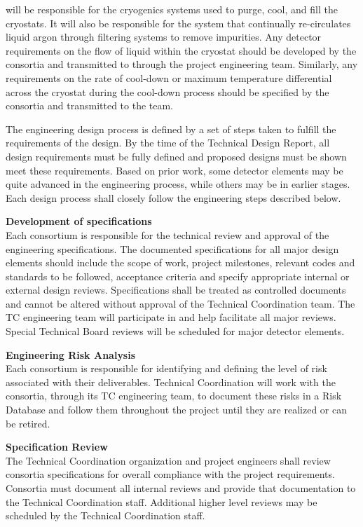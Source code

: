  will be responsible for the cryogenics systems used to purge,
cool, and fill the cryostats.  It will also be responsible for the
system that continually re-circulates liquid argon through filtering
systems to remove impurities.  Any detector requirements on the flow
of liquid within the cryostat should be developed by the consortia and
transmitted to  through the project engineering team.  Similarly,
any requirements on the rate of cool-down or maximum temperature
differential across the cryostat during the cool-down process should
be specified by the consortia and transmitted to the  team.

The engineering design process is defined by a set of steps taken to
fulfill the requirements of the design.  By the time of the Technical
Design Report, all design requirements must be fully defined and
proposed designs must be shown meet these requirements.  Based on
prior work, some detector elements may be quite advanced in the
engineering process, while others may be in earlier stages.  Each
design process shall closely follow the engineering steps described
below.


{\bf Development of specifications}\\
Each consortium is responsible for the technical review and approval
of the engineering specifications.  The documented specifications for
all major design elements should include the scope of work, project
milestones, relevant codes and standards to be followed, acceptance
criteria and specify appropriate internal or external design reviews.
Specifications shall be treated as controlled documents and cannot be
altered without approval of the  Technical Coordination team.  The
TC engineering team will participate in and help facilitate all
major reviews.  Special Technical Board reviews will be scheduled for
major detector elements.

{\bf Engineering Risk Analysis}\\
Each consortium is responsible for identifying and defining the level
of risk associated with their deliverables.   Technical
Coordination will work with the consortia, through its
TC engineering team, to document these risks in a Risk Database
and follow them throughout the project until they are realized or can
be retired.

{\bf Specification Review}\\
The  Technical Coordination organization and project engineers
shall review consortia specifications for overall compliance with the
project requirements.  Consortia must document all internal reviews
and provide that documentation to the Technical Coordination staff.
Additional higher level reviews may be scheduled by the Technical
Coordination staff.

